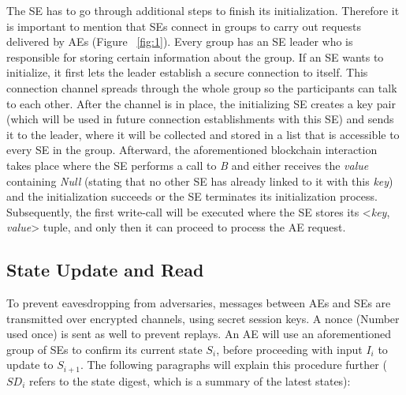 The SE has to go through additional steps to finish its initialization. Therefore it is important to mention that SEs connect in groups to carry out requests delivered by AEs (Figure ~\ref{fig:1}). Every group has an SE leader who is responsible for storing certain information about the group. If an SE wants to initialize, it first lets the leader establish a secure connection to itself. This connection channel spreads through the whole group so the participants can talk to each other. After the channel is in place, the initializing SE creates a key pair (which will be used in future connection establishments with this SE) and sends it to the leader, where it will be collected and stored in a list that is accessible to every SE in the group. Afterward, the aforementioned blockchain interaction takes place where the SE performs a call to \textit{B} and either receives the \textit{value} containing \textit{Null} (stating that no other SE has already linked to it with this \textit{key}) and the initialization succeeds or the SE terminates its initialization process. Subsequently, the first write-call will be executed where the SE stores its <\textit{key}, \textit{value}> tuple, and only then it can proceed to process the AE request.

\subsection{State Update and Read}

To prevent eavesdropping from adversaries, messages between AEs and SEs are transmitted over encrypted channels, using secret session keys. A nonce (Number used once) is sent as well to prevent replays. An AE will use an aforementioned group of SEs to confirm its current state \(S_i\), before proceeding with input \(I_i\) to update to \(S_{i+1}\). The following paragraphs will explain this procedure further (\(SD_{i}\) refers to the state digest, which is a summary of the latest states):

